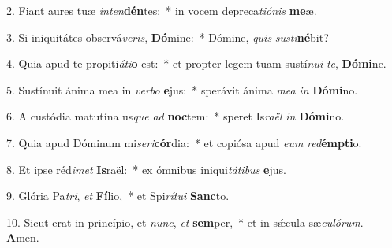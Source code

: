 2. Fiant aures tuæ \textit{in}\textit{ten}\textbf{dén}tes:~*  in vocem depreca\textit{ti}\textit{ó}\textit{nis} \textbf{me}æ.\

3. Si iniquitátes observá\textit{ve}\textit{ris}, \textbf{Dó}mine:~*  Dómine, \textit{quis} \textit{sus}\textit{ti}\textbf{né}bit?\

4. Quia apud te propiti\textit{á}\textit{ti}\textbf{o} est:~*  et propter legem tuam sustí\textit{nu}\textit{i} \textit{te}, \textbf{Dó}\textbf{mi}ne.\

5. Sustínuit ánima mea in \textit{ver}\textit{bo} \textbf{e}jus:~*  sperávit ánima \textit{me}\textit{a} \textit{in} \textbf{Dó}\textbf{mi}no.\

6. A custódia matutína us\textit{que} \textit{ad} \textbf{noc}tem:~*  speret Is\textit{ra}\textit{ël} \textit{in} \textbf{Dó}\textbf{mi}no.\

7. Quia apud Dóminum mi\textit{se}\textit{ri}\textbf{cór}dia:~*  et copiósa apud \textit{e}\textit{um} \textit{red}\textbf{émp}\textbf{ti}o.\

8. Et ipse réd\textit{i}\textit{met} \textbf{Is}raël:~*  ex ómnibus iniqui\textit{tá}\textit{ti}\textit{bus} \textbf{e}jus.\

9. Glória Pa\textit{tri}, \textit{et} \textbf{Fí}lio,~*  et Spi\textit{rí}\textit{tu}\textit{i} \textbf{Sanc}to.\

10. Sicut erat in princípio, et \textit{nunc}, \textit{et} \textbf{sem}per,~*  et in sǽcula sæ\textit{cu}\textit{ló}\textit{rum}. \textbf{A}men.\

